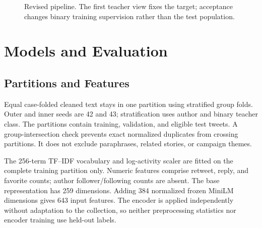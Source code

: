 \documentclass[conference]{IEEEtran}
\begin{document}
\begin{figure}[t]
\centering
{}
\caption{Revised pipeline. The first teacher view fixes the target; acceptance changes binary training supervision rather than the test population.}
\label{fig:pipeline}
\end{figure}

\section{Models and Evaluation}
\subsection{Partitions and Features}
Equal case-folded cleaned text stays in one partition using stratified group folds. Outer and inner seeds are 42 and 43; stratification uses author and binary teacher class. The partitions contain \NumTrain{} training, \NumValidation{} validation, and \NumTest{} eligible test tweets. A group-intersection check prevents exact normalized duplicates from crossing partitions. It does not exclude paraphrases, related stories, or campaign themes.

The 256-term TF--IDF vocabulary and log-activity scaler are fitted on the complete training partition only. Numeric features comprise retweet, reply, and favorite counts; author follower/following counts are absent. The base representation has 259 dimensions. Adding 384 normalized frozen MiniLM dimensions gives 643 input features. The encoder is applied independently without adaptation to the collection, so neither preprocessing statistics nor encoder training use held-out labels.
\end{document}
